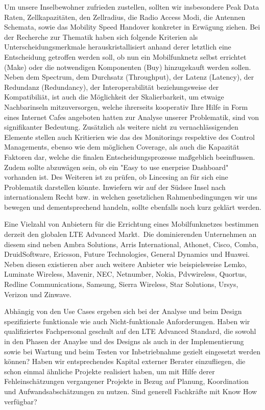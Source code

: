 	Um unsere Inselbewohner zufrieden zustellen, sollten wir insbesondere Peak Data Raten, Zellkapazitäten, den Zellradius, die Radio Access Modi, die Antennen Schemata, sowie das Mobility Speed Handover konkreter in Erwägung ziehen.
	Bei der Recherche zur Thematik haben sich folgende Kriterien als Unterscheidungsmerkmale herauskristallisiert anhand derer letztlich eine Entscheidung getroffen werden soll, ob nun ein Mobilfunknetz selbst errichtet (Make) oder die notwendigen Komponenten (Buy) hinzugekauft werden sollen. Neben dem Spectrum, dem Durchsatz (Throughput), der Latenz (Latency),  der Redundanz (Redundancy), der Interoperabilität beziehungsweise der Kompatibiliät, ist auch die Möglichkeit der Skalierbarkeit, um etwaige Nachbarinseln mitzuversorgen, welche ihrerseits kooperativ Ihre Hilfe in Form eines Internet Cafes angeboten hatten zur Analyse unserer Problematik, sind von signifikanter Bedeutung. Zusätzlich  als weitere nicht zu vernachlässigenden Elemente stellen auch Kritierien wie das des Monitorings respektive des Control Managements, ebenso wie dem möglichen Coverage, als auch die Kapazität  Faktoren dar, welche die finalen Entscheidungsprozesse maßgeblich beeinflussen. Zudem sollte abzuwägen sein, ob ein "Easy to use enerprise Dashboard" vorhanden ist. Des Weiteren ist zu prüfen, ob Lincesing an für sich eine Problematik darstellen könnte. Inwiefern wir auf der Südsee Insel nach internationalem Recht bzw. in welchen gesetzlichen Rahmenbedingungen wir uns bewegen und dementsprechend handeln, sollte ebenfalls noch kurz geklärt werden.
	
	Eine Vielzahl von Anbietern für die Errichtung eines Mobilfunknetzes bestimmen derzeit den globalen LTE Advanced Markt.\ Die dominierenden Unternehmen an diesem sind neben Ambra Solutions, Arris International,
	Athonet, Cisco, Comba, DruidSoftware, Ericsson, Future Technologies, General Dynamics und 
	Huawei. Neben diesen existieren aber auch weitere Anbieter wie beispielsweise Lemko, Luminate Wireless,
	Mavenir,
	NEC,
	Netnumber,
	Nokia,
	Pdvwireless,
	Quortus,
	Redline Communications,
	Samsung,
	Sierra Wireless,
	Star Solutions,
	Ursys,
	Verizon und 
	Zinwave.
	
	Abhängig von den Use Cases ergeben sich bei der Analyse und beim Design spezifizierte funktionale wie auch Nicht-funktionale Anforderungen. Haben wir qualifiziertes Fachpersonal geschult auf den LTE Advanced Standard, die sowohl in den Phasen der Anaylse und des Designs als auch in der Implementierung sowie bei Wartung und beim Testen vor Inbetriebnahme gezielt eingesetzt werden können? Haben wir entsprechendes Kapital externer Berater einzufliegen, die schon einmal ähnliche Projekte realisiert haben, um mit Hilfe derer Fehleinschätzungen vergangener Projekte in Bezug auf Planung, Koordination und Aufwandsabschätzungen zu nutzen. Sind generell Fachkräfte mit Know How verfügbar?
